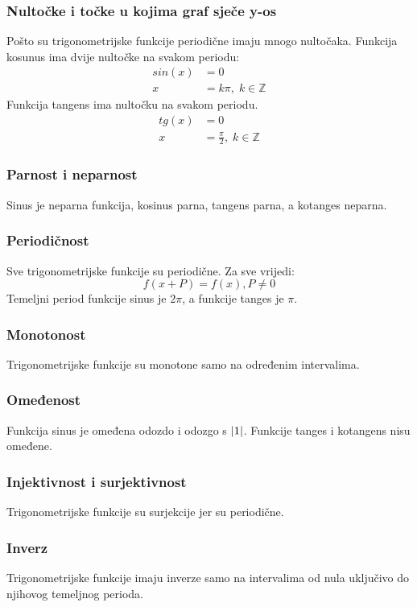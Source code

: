 \subsubsection{Nultočke i točke u kojima graf sječe y-os \trig}
    Pošto su trigonometrijske funkcije periodične imaju mnogo nultočaka.
    Funkcija kosunus ima dvije nultočke na svakom periodu:
    \begin{equation*}
        \begin{split}
            sin(x) &= 0 \\
            x &= k\pi,\; k \in \mathbb{Z} 
        \end{split}
    \end{equation*}
    Funkcija tangens ima nultočku na svakom periodu.
    \begin{equation*}
        \begin{split}
            tg(x) &= 0 \\
            x &= \frac{\pi}{2},\; k \in \mathbb{Z} 
        \end{split}
    \end{equation*}

\subsubsection{Parnost i neparnost \trig}
    Sinus je neparna funkcija, kosinus parna, tangens parna, a kotanges neparna.

\subsubsection{Periodičnost \trig}
    Sve trigonometrijske funkcije su periodične. Za sve vrijedi:
    \[f(x + P) = f(x), P \neq 0\]
    Temeljni period funkcije sinus je \(2\pi\), a funkcije tanges je \(\pi\).

\subsubsection{Monotonost \trig}
    Trigonometrijske funkcije su monotone samo na određenim intervalima.
    
\subsubsection{Omeđenost \trig}
    Funkcija sinus je omeđena odozdo i odozgo s \(\abs{1}\). Funkcije tanges i kotangens nisu omeđene.

\subsubsection{Injektivnost i surjektivnost \trig}
    Trigonometrijske funkcije su surjekcije jer su periodične. 

\subsubsection{Inverz \trig}
    Trigonometrijske funkcije imaju inverze samo na intervalima od nula uključivo do njihovog temeljnog perioda.